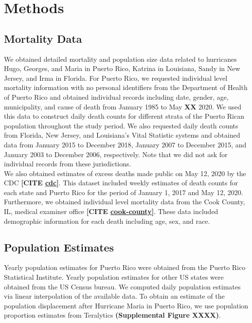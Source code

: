 \documentclass[11pt]{article}
\begin{document}
\section{Methods}
\label{sec:methods}

\subsection{Mortality Data}
\label{subsec:mortality-data}
We obtained detailed mortality and population size data related to hurricanes Hugo, Georges, and Maria in Puerto Rico, Katrina in Louisiana, Sandy in New Jersey, and Irma in Florida. For Puerto Rico, we requested individual level mortality information with no personal identifiers from the Department of Health of Puerto Rico and obtained individual records including date, gender, age, municipality, and cause of death from January 1985 to May \textbf{XX} 2020. We used this data to construct daily death counts for different strata of the Puerto Rican population throughout the study period. We also requested daily death counts from Florida, New Jersey, and Louisiana’s Vital Statistic systems and obtained data from January 2015 to December 2018, January 2007 to December 2015, and January 2003 to December 2006, respectively. Note that we did not ask for individual records from these jurisdictions. \\ 

We also obtained estimates of excess deaths made public on May 12, 2020 by the CDC \textbf{[CITE \href{https://www.cdc.gov/nchs/nvss/vsrr/covid19/excess_deaths.htm}{cdc}]}. This dataset included weekly estimates of death counts for each state and Puerto Rico for the period of January 1, 2017 and May 12, 2020. Furthermore, we obtained individual level mortality data from the Cook County, IL, medical examiner office \textbf{[CITE \href{https://www.cookcountyil.gov/agency/medical-examiner}{cook-county}]}. These data included demographic information for each death including age, sex, and race.

\subsection{Population Estimates}
\label{subsec:population}
Yearly population estimates for Puerto Rico were obtained from the Puerto Rico Statistical Institute. Yearly population estimates for other US states were obtained from the US Census bureau. We computed daily population estimates via linear interpolation of the available data. To obtain an estimate of the population displacement after Hurricane Maria in Puerto Rico, we use population proportion estimates from Teralytics \textbf{(Supplemental Figure XXXX)}.
\end{document}
